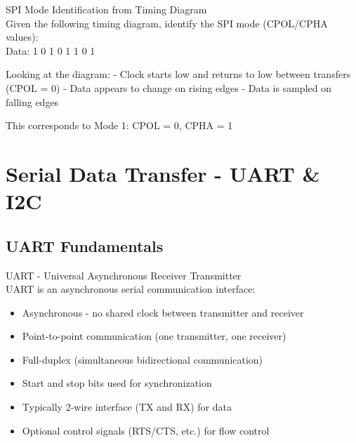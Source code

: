 \begin{example2}{SPI Mode Identification from Timing Diagram}\\
Given the following timing diagram, identify the SPI mode (CPOL/CPHA values):
\\
Data:  1     0     1     0     1     1     0     1

\tcblower
Looking at the diagram:
- Clock starts low and returns to low between transfers (CPOL = 0)
- Data appears to change on rising edges
- Data is sampled on falling edges

This corresponds to Mode 1: CPOL = 0, CPHA = 1
\end{example2}

\raggedcolumns
\pagebreak

\section{Serial Data Transfer - UART \& I2C}

\subsection{UART Fundamentals}


\begin{concept}{UART - Universal Asynchronous Receiver Transmitter}\\
UART is an asynchronous serial communication interface:
\begin{itemize}
    \item Asynchronous - no shared clock between transmitter and receiver
    \item Point-to-point communication (one transmitter, one receiver)
    \item Full-duplex (simultaneous bidirectional communication)
    \item Start and stop bits used for synchronization
    \item Typically 2-wire interface (TX and RX) for data
    \item Optional control signals (RTS/CTS, etc.) for flow control
\end{itemize}
\end{concept}

